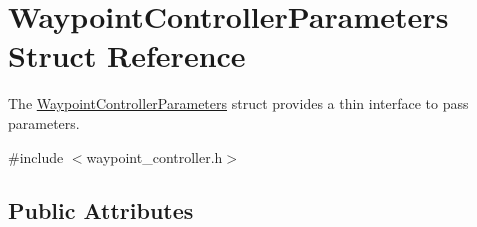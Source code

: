 \hypertarget{struct_waypoint_controller_parameters}{\section{Waypoint\-Controller\-Parameters Struct Reference}
\label{struct_waypoint_controller_parameters}
}


The \hyperlink{struct_waypoint_controller_parameters}{Waypoint\-Controller\-Parameters} struct provides a thin interface to pass parameters.  




{\ttfamily \#include $<$waypoint\-\_\-controller.\-h$>$}

\subsection*{Public Attributes}
